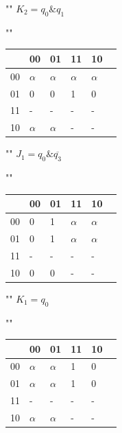 \begin{center}
	""\newline\newline
	$K_{2} = q_{0} \& q_{1}$
	
	""\newline
	\begin{tabular}{ | l | l | l | l | l | p{1cm} |}
		\hline
		\diagbox[width=5em]{$q_{3}q_{2}$}{$q_{1}q_{0}$} & 00 & 01 & 11 & 10 \\\hline
		00 & $\alpha$ & $\alpha$  & \cellcolor{blue!25} $\alpha$ & $\alpha$  \\\hline
		01 & 0 & 0  & \cellcolor{blue!25} 1 & 0  \\\hline
		11 & - & -  & \cellcolor{blue!25} - & -  \\\hline
		10 & $\alpha$ & $\alpha$ & \cellcolor{blue!25} - & -  \\
		\hline
	\end{tabular}

	""\newline\newline
	$J_{1} = q_{0} \& \overline{q_{3}}$
	
	""\newline
	\begin{tabular}{ | l | l | l | l | l | p{1cm} |}
		\hline
		\diagbox[width=5em]{$q_{3}q_{2}$}{$q_{1}q_{0}$} & 00 & 01 & 11 & 10 \\\hline
		00 & 0 & \cellcolor{blue!25} 1  & \cellcolor{blue!25} $\alpha$ & $\alpha$  \\\hline
		01 & 0 & \cellcolor{blue!25} 1  & \cellcolor{blue!25} $\alpha$ & $\alpha$  \\\hline
		11 & - & -  & - & -  \\\hline
		10 & 0 & 0  & - & -  \\
		\hline
	\end{tabular}

	""\newline\newline
	$K_{1} = q_{0}$
	
	""\newline
	\begin{tabular}{ | l | l | l | l | l | p{1cm} |}
		\hline
		\diagbox[width=5em]{$q_{3}q_{2}$}{$q_{1}q_{0}$} & 00 & 01 & 11 & 10 \\\hline
		00 & $\alpha$ & \cellcolor{blue!25} $\alpha$  & \cellcolor{blue!25} 1 & 0  \\\hline
		01 & $\alpha$ & \cellcolor{blue!25} $\alpha$  & \cellcolor{blue!25} 1 & 0  \\\hline
		11 & - & \cellcolor{blue!25} -  & \cellcolor{blue!25} - & -  \\\hline
		10 & $\alpha$ & \cellcolor{blue!25} $\alpha$ & \cellcolor{blue!25} - & -  \\
		\hline
	\end{tabular}


\end{center}
